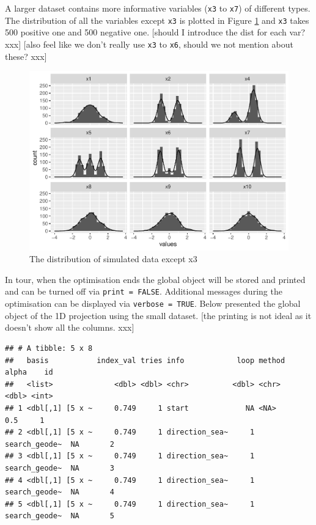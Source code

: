 \documentclass[12pt]{article}
\begin{document}
A larger dataset contains more informative variables (\texttt{x3} to
\texttt{x7}) of different types. The distribution of all the variables
except \texttt{x3} is plotted in Figure \ref{origin-data} and
\texttt{x3} takes 500 positive one and 500 negative one. {[}should I
introduce the dist for each var? xxx{]} {[}also feel like we don't
really use \texttt{x3} to \texttt{x6}, should we not mention about
these? xxx{]}

\begin{figure}
\centering
\includegraphics{paper_files/figure-latex/origin-data-1.pdf}
\caption{\label{origin-data} The distribution of simulated data except
x3}
\end{figure}

In tour, when the optimisation ends the global object will be stored and
printed and can be turned off via \texttt{print\ =\ FALSE}. Additional
messages during the optimisation can be displayed via
\texttt{verbose\ =\ TRUE}. Below presented the global object of the 1D
projection using the small dataset. {[}the printing is not ideal as it
doesn't show all the columns. xxx{]}

\begin{verbatim}
## # A tibble: 5 x 8
##   basis           index_val tries info            loop method        alpha    id
##   <list>              <dbl> <dbl> <chr>          <dbl> <chr>         <dbl> <int>
## 1 <dbl[,1] [5 x ~     0.749     1 start             NA <NA>            0.5     1
## 2 <dbl[,1] [5 x ~     0.749     1 direction_sea~     1 search_geode~  NA       2
## 3 <dbl[,1] [5 x ~     0.749     1 direction_sea~     1 search_geode~  NA       3
## 4 <dbl[,1] [5 x ~     0.749     1 direction_sea~     1 search_geode~  NA       4
## 5 <dbl[,1] [5 x ~     0.749     1 direction_sea~     1 search_geode~  NA       5
\end{verbatim}
\end{document}
